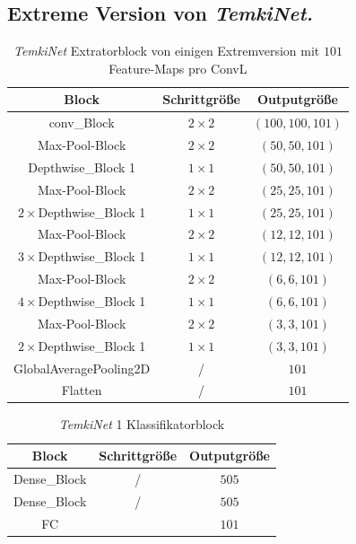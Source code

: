 \documentclass[12pt,a4paper]{scrartcl}
\numberwithin{equation}{section}
\begin{document}
\subsection{Extreme Version von \textit{TemkiNet.}}
\begin{table}[h!]
	\centering
	\begin{tabular}{|c|c|c|}
		\hline
		Block & Schrittgröße & Outputgröße\\ \hline
		conv\_Block &	$ 2\times2 $ &$ (100,100, 101) $\\ \hline
		 Max-Pool-Block  & $ 2\times2 $&$ (50,50, 101) $\\ \hline
		Depthwise\_Block 1 & $ 1\times1 $&$ (50,50, 101) $\\ \hline
		
		 Max-Pool-Block & $ 2\times2 $&$ (25,25, 101) $\\ \hline
		$ 2\times $Depthwise\_Block 1& $ 1\times1 $&$ (25,25, 101) $\\ \hline
		
		 Max-Pool-Block  & $ 2\times2 $&$ (12,12, 101) $\\ \hline
		$ 3\times $Depthwise\_Block 1& $ 1\times1 $&$ (12,12, 101) $\\ \hline
		
		 Max-Pool-Block  & $ 2\times2 $&$ (6,6, 101) $\\ \hline
		$ 4\times $Depthwise\_Block 1 & $ 1\times1 $&$ (6,6, 101) $\\ \hline
		
		 Max-Pool-Block   & $ 2\times2 $&$ (3,3, 101) $\\ \hline
		$ 2\times $Depthwise\_Block 1& $ 1\times1 $&$ (3,3, 101) $\\ \hline
		GlobalAveragePooling2D & / &$ 101 $ \\ \hline
		Flatten & / &$ 101 $ \\ \hline
		
	\end{tabular}
	\caption{\textit{TemkiNet} Extratorblock von einigen Extremversion  mit $ 101 $ Feature-Maps pro \ac{ConvL}}
	\label{tab:Temki_Architectur1}
\end{table}

\begin{table}[h!]
	\centering
	\begin{tabular}{|c|c|c|}
		\hline
		Block & Schrittgröße & Outputgröße\\ \hline		
		Dense\_Block & / &$ 505 $\\ \hline
		Dense\_Block & / &$ 505 $\\ \hline
		FC & & $ 101 $\\ \hline
	\end{tabular}
	\caption{\textit{TemkiNet} 1 Klassifikatorblock}
	\label{tab:Temki_Architectur 1}
\end{table}
\end{document}
